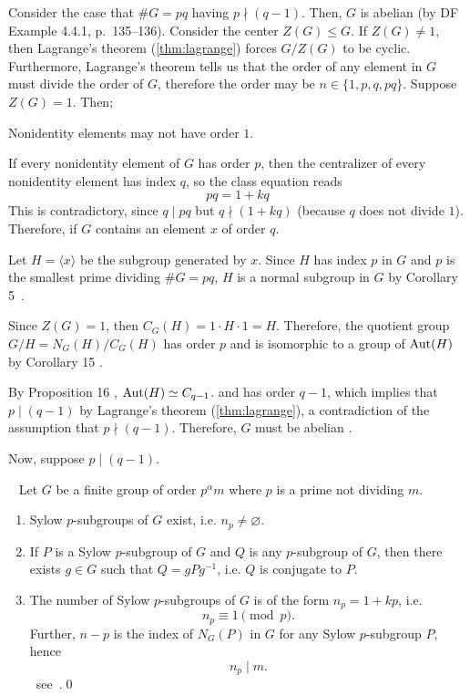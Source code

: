 Consider the case that $\#G = pq$ having $p \nmid (q-1)$.
Then, $G$ is abelian (by DF Example 4.4.1, p.~135--136).
Consider the center $Z(G) \le G$. If $Z(G) \ne 1$, then Lagrange's theorem (\ref{thm:lagrange})
forces $G/Z(G)$ to be cyclic.
Furthermore, Lagrange's theorem tells us that the order of any element in $G$ must divide the
order of $G$, therefore the order may be $n \in \{1, p, q, pq \}$.
Suppose $Z(G) = 1$. Then;
\begin{enumalph}
  \item Nonidentity elements may not have order $1$.
  \item If every nonidentity element of $G$ has order $p$,
    then the centralizer of every nonidentity
    element has index $q$, so the class equation reads \[pq = 1 + kq \]
    This is contradictory, since $q \mid pq$ but $q \nmid (1 + kq)$
    (because $q$ does not divide $1$).
    Therefore, if $G$ contains an element $x$ of order $q$.
  \item Let $H = \langle x \rangle$ be the subgroup generated by $x$.
    Since $H$ has index $p$ in $G$ and $p$ is the smallest prime dividing $\#G = pq$,
    $H$ is a normal subgroup in $G$ by Corollary 5~\cite[p. 120]{DummitFoote}.
  \item Since $Z(G) = 1$, then $C_G(H) = 1 \cdot H \cdot 1 = H$. Therefore, the
    quotient group $G/H = N_G(H)/C_G(H)$ has order $p$ and is isomorphic to a group of
    $\operatorname{Aut}(H)$ by Corollary 15 \cite[p. 134]{DummitFoote}.
  \item By Proposition 16 \cite[p. 135]{DummitFoote}, $\operatorname{Aut}(H) \simeq C_{q-1}$.
    and has order $q-1$, which implies that $p \mid (q-1)$ by Lagrange's theorem (\ref{thm:lagrange}),
    a contradiction of the assumption that $p \nmid (q-1)$. Therefore, $G$ must be abelian
    .~\label{eqn:p_not_div_q-1}

\end{enumalph}

Now, suppose $p \mid (q-1)$.

\begin{theorem}~\label{thm:sylow}
  Let $G$ be a finite group of order $p^{\alpha}m$ where $p$ is a prime not dividing $m$.
  \begin{enumerate}[label=\arabic{enumi}.]
    \item Sylow $p$-subgroups of $G$ exist, i.e. $n_p \ne \varnothing$.
    \item If $P$ is a Sylow $p$-subgroup of $G$ and $Q$ is any $p$-subgroup of $G$,
      then there exists $g \in G$ such that $Q = gPg^{-1}$, i.e. $Q$ is conjugate to $P$.
    \item The number of Sylow $p$-subgroups of $G$ is of the form
      $n_p = 1 + kp$, i.e. \[ n_p \equiv 1 \pmod p. \]
      Further, $n-p$ is the index of $N_G(P)$ in $G$ for any Sylow $p$-subgroup $P$,
      hence \[ n_p \mid m. \]~see~\cite[Theorem 18,~p.~139]{DummitFoote}.\qed
  \end{enumerate}
  
\end{theorem}

